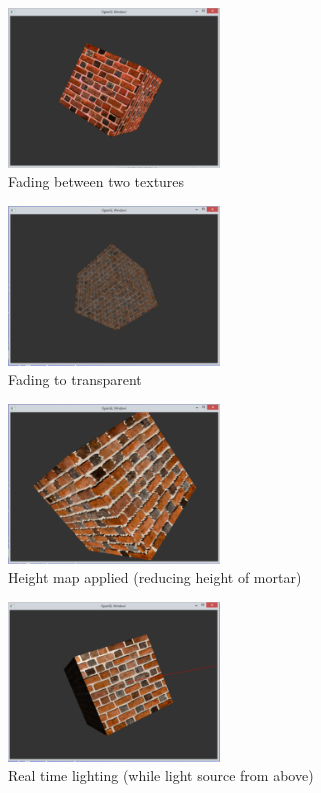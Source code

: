 \documentclass[a4paper]{article}
\title{\DOCTITLE}
\author{\DOCAUTHOR}
\date{\DOCDATE}
\begin{document}
\begin{figure}[h!]
  \centering
  \includegraphics[width=0.50\textwidth]{graphics/screen_1.eps}
  \caption{Fading between two textures}
  \label{fig:screen_1}
\end{figure}

\begin{figure}[h!]
  \centering
  \includegraphics[width=0.50\textwidth]{graphics/screen_2.eps}
  \caption{Fading to transparent}
  \label{fig:screen_2}
\end{figure}

\begin{figure}[h!]
  \centering
  \includegraphics[width=0.50\textwidth]{graphics/screen_3.eps}
  \caption{Height map applied (reducing height of mortar)}
  \label{fig:screen_3}
\end{figure}

\begin{figure}[h!]
  \centering
  \includegraphics[width=0.50\textwidth]{graphics/screen_5.eps}
  \caption{Real time lighting (while light source from above)}
  \label{fig:screen_5}
\end{figure}
\end{document}
